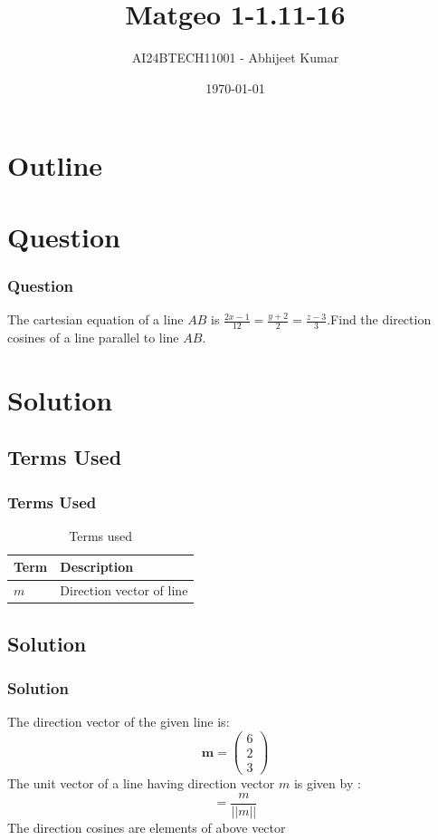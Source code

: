 \documentclass{beamer}
\title{Matgeo 1-1.11-16}
\author{AI24BTECH11001 - Abhijeet Kumar}
\date{\today}
\theoremstyle{remark}
\let\vec\mathbf
\numberwithin{equation}{section}
\begin{document}
\begin{frame}
\titlepage
\end{frame}

\section*{Outline}
\begin{frame}
\tableofcontents
\end{frame}

\section{Question}
\begin{frame}
\frametitle{Question}

The cartesian equation of a line $AB$ is $\frac{2x-1}{12}=\frac{y+2}{2}=\frac{z-3}{3}$.Find the direction cosines of a line parallel to line $AB$.
\end{frame}

\section{Solution}
\subsection{Terms Used}
\begin{frame}
\frametitle{Terms Used}
\begin{table}[htbp]
    \centering
    \caption{Terms used}
    \label{tab:parameters}
    \begin{tabular}{|p{1.7cm}|p{4cm}|}
    \hline\textbf{Term} & \textbf{Description}\\
    \hline
    $m$&Direction vector of line \\
    \hline
    \end{tabular}
\end{table}
\end{frame}

\subsection{Solution}
\begin{frame}
\frametitle{Solution}

The direction vector of the given line is$\colon$
\begin{equation*}
    \vec{m}=\begin{pmatrix}
        6\\
        2\\
        3
    \end{pmatrix}
\end{equation*}
The unit vector of a line having direction vector $m$ is given by $\colon$
\begin{equation}
    = \frac{m}{||m||}
\end{equation}
The direction cosines are elements of above vector  
\end{frame}
\end{document}
